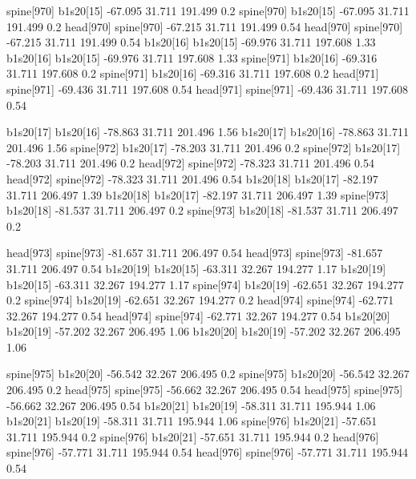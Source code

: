spine[970]    b1s20[15]    -67.095    31.711    191.499    0.2
spine[970]    b1s20[15]    -67.095    31.711    191.499    0.2
head[970]    spine[970]    -67.215    31.711    191.499    0.54
head[970]    spine[970]    -67.215    31.711    191.499    0.54
b1s20[16]    b1s20[15]    -69.976    31.711    197.608    1.33
b1s20[16]    b1s20[15]    -69.976    31.711    197.608    1.33
spine[971]    b1s20[16]    -69.316    31.711    197.608    0.2
spine[971]    b1s20[16]    -69.316    31.711    197.608    0.2
head[971]    spine[971]    -69.436    31.711    197.608    0.54
head[971]    spine[971]    -69.436    31.711    197.608    0.54


b1s20[17]    b1s20[16]    -78.863    31.711    201.496    1.56
b1s20[17]    b1s20[16]    -78.863    31.711    201.496    1.56
spine[972]    b1s20[17]    -78.203    31.711    201.496    0.2
spine[972]    b1s20[17]    -78.203    31.711    201.496    0.2
head[972]    spine[972]    -78.323    31.711    201.496    0.54
head[972]    spine[972]    -78.323    31.711    201.496    0.54
b1s20[18]    b1s20[17]    -82.197    31.711    206.497    1.39
b1s20[18]    b1s20[17]    -82.197    31.711    206.497    1.39
spine[973]    b1s20[18]    -81.537    31.711    206.497    0.2
spine[973]    b1s20[18]    -81.537    31.711    206.497    0.2


head[973]    spine[973]    -81.657    31.711    206.497    0.54
head[973]    spine[973]    -81.657    31.711    206.497    0.54
b1s20[19]    b1s20[15]    -63.311    32.267    194.277    1.17
b1s20[19]    b1s20[15]    -63.311    32.267    194.277    1.17
spine[974]    b1s20[19]    -62.651    32.267    194.277    0.2
spine[974]    b1s20[19]    -62.651    32.267    194.277    0.2
head[974]    spine[974]    -62.771    32.267    194.277    0.54
head[974]    spine[974]    -62.771    32.267    194.277    0.54
b1s20[20]    b1s20[19]    -57.202    32.267    206.495    1.06
b1s20[20]    b1s20[19]    -57.202    32.267    206.495    1.06


spine[975]    b1s20[20]    -56.542    32.267    206.495    0.2
spine[975]    b1s20[20]    -56.542    32.267    206.495    0.2
head[975]    spine[975]    -56.662    32.267    206.495    0.54
head[975]    spine[975]    -56.662    32.267    206.495    0.54
b1s20[21]    b1s20[19]    -58.311    31.711    195.944    1.06
b1s20[21]    b1s20[19]    -58.311    31.711    195.944    1.06
spine[976]    b1s20[21]    -57.651    31.711    195.944    0.2
spine[976]    b1s20[21]    -57.651    31.711    195.944    0.2
head[976]    spine[976]    -57.771    31.711    195.944    0.54
head[976]    spine[976]    -57.771    31.711    195.944    0.54


